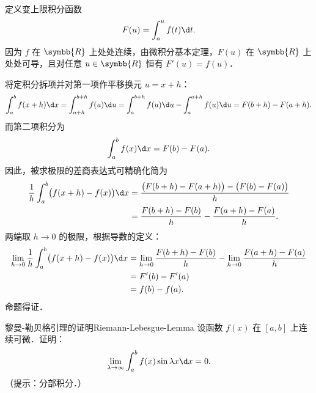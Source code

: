 \begin{myproof}
    定义变上限积分函数
    \begin{equation}
        F(u) = \int_a^u f(t) \d t.
    \end{equation}
    因为 $f$ 在 $\symbb{R}$ 上处处连续，由微积分基本定理，$F(u)$ 在 $\symbb{R}$ 上处处可导，且对任意 $u \in \symbb{R}$ 恒有 $F'(u) = f(u)$．

    将定积分拆项并对第一项作平移换元 $u = x + h$：
    \begin{equation}
        \int_a^b f(x + h) \d x = \int_{a+h}^{b+h} f(u) \d u = \int_a^{b+h} f(u)\d u - \int_a^{a+h} f(u)\d u = F(b + h) - F(a + h).
    \end{equation}
    而第二项积分为
    \begin{equation}
        \int_a^b f(x) \d x = F(b) - F(a).
    \end{equation}
    因此，被求极限的差商表达式可精确化简为
    \begin{equation}
        \begin{aligned}
            \frac{1}{h}\int_a^b \bigl(f(x + h) - f(x)\bigr) \d x & = \frac{\bigl(F(b + h) - F(a + h)\bigr) - \bigl(F(b) - F(a)\bigr)}{h} \\
                                                                 & = \frac{F(b + h) - F(b)}{h} - \frac{F(a + h) - F(a)}{h}.
        \end{aligned}
    \end{equation}
    两端取 $h \to 0$ 的极限，根据导数的定义：
    \begin{equation}
        \begin{aligned}
            \lim_{h\to 0} \frac{1}{h}\int_a^b \bigl(f(x + h) - f(x)\bigr) \d x & = \lim_{h\to 0}\frac{F(b + h) - F(b)}{h} - \lim_{h\to 0}\frac{F(a + h) - F(a)}{h} \\
                                                                               & = F'(b) - F'(a)                                                                   \\
                                                                               & = f(b) - f(a).
        \end{aligned}
    \end{equation}
    命题得证．
\end{myproof}

\begin{problem}{黎曼-勒贝格引理的证明}{Riemann-Lebesgue-Lemma}
    设函数 $f(x)$ 在 $[a, b]$ 上连续可微．证明：
    \begin{equation}
        \lim_{\lambda\to \infty} \int_a^b f(x) \sin \lambda x \d x = 0.
    \end{equation}
    （提示：分部积分．）
\end{problem}

